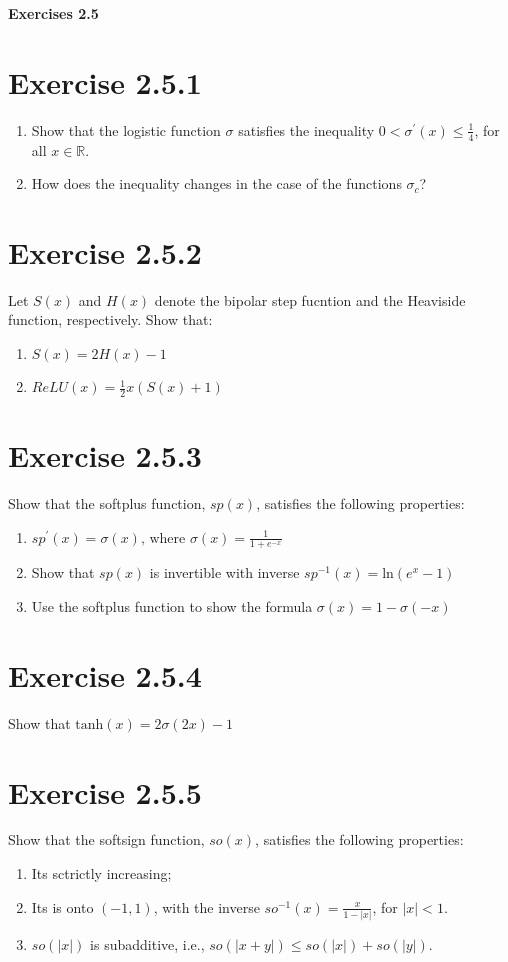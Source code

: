 \documentclass{exam}
\begin{document}
\begin{center}
    \textbf{\Large Exercises 2.5}    
\end{center}

\section*{Exercise 2.5.1}
\begin{enumerate}
    \item Show that the logistic function $\sigma$ satisfies the inequality $ 0 < \sigma^{\prime}(x) \leq \frac{1}{4}$, for all $x \in \mathbb{R}$.
    \item How does the inequality changes in the case of the functions $\sigma_{c}$?
\end{enumerate}  

\section*{Exercise 2.5.2}
Let $S(x)$ and $H(x)$ denote the bipolar step fucntion and the Heaviside function, respectively. Show that: \\
\begin{enumerate}
    \item $S(x) = 2H(x) - 1 $
    \item $ReLU(x) = \frac{1}{2}x(S(x) + 1)$
\end{enumerate}
\section*{Exercise 2.5.3}
Show that the softplus function, $sp(x)$, satisfies the following properties:
\begin{enumerate}
    \item $sp^\prime(x) = \sigma(x)\text{, where } \sigma(x) = \frac{1}{1 + e^{-x}}$
    \item Show that $sp(x)$ is invertible with inverse $sp^{-1}(x) = \text{ln}(e^x - 1)$
    \item Use the softplus function to show the formula $\sigma(x) = 1 - \sigma(-x)$
\end{enumerate}

\section*{Exercise 2.5.4}
Show that $\text{tanh}(x) = 2\sigma(2x) - 1 $

\section*{Exercise 2.5.5}
Show that the softsign function, $so(x)$, satisfies the following properties:
\begin{enumerate}
    \item Its sctrictly increasing;
    \item Its is onto $(-1,1)$, with the inverse $so^{-1}(x) = \frac{x}{1 - |x|}$, for $|x| < 1$.
    \item $so(|x|)$ is subadditive, i.e., $so(|x+y|) \leq so(|x|) + so(|y|)$. 
\end{enumerate}
\end{document}
